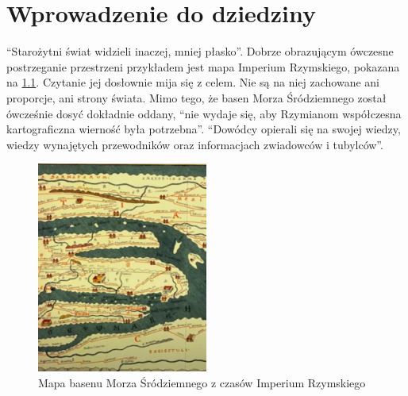 \chapter{Wprowadzenie do dziedziny}\label{chap:intr}

“Starożytni świat widzieli inaczej, mniej płasko”\cite{gbobrektvgry}. Dobrze obrazującym ówczesne postrzeganie przestrzeni przykładem jest mapa Imperium Rzymskiego,
pokazana na \ref{fig:mapaIR}. Czytanie jej dosłownie mija się z celem. Nie są na niej zachowane ani proporcje, ani strony świata. Mimo tego, że
basen Morza Śródziemnego został ówcześnie dosyć dokładnie oddany, “nie wydaje się, aby Rzymianom współczesna kartograficzna wierność była potrzebna”\cite{gbobrektvgry}.
“Dowódcy opierali się na swojej wiedzy, wiedzy wynajętych przewodników oraz informacjach zwiadowców i tubylców”\cite{gbobrektvgry}.
\begin{figure}[htbp]
    \centering
    \includegraphics[width=0.5\textwidth]{images/mapaIR.png}
    \caption{Mapa basenu Morza Śródziemnego z czasów Imperium Rzymskiego}\label{fig:mapaIR}
\end{figure}
